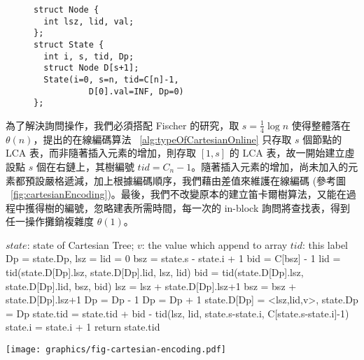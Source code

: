 \documentclass{gapd}
\begin{document}
\begin{figure}
\begin{lstlisting}
struct Node {
  int lsz, lid, val;
};
struct State {
  int i, s, tid, Dp;
  struct Node D[s+1];
  State(i=0, s=n, tid=C[n]-1, 
           D[0].val=INF, Dp=0)
};
\end{lstlisting}
\end{figure}

為了解決詢問操作，我們必須搭配 Fischer \cite{fischer} 的研究，取 $s = \frac{1}{4} \log n$ 使得整體落在 $\theta(n)$，提出的在線編碼算法 ~\ref{alg:typeOfCartesianOnline} 只存取 $s$ 個節點的 LCA 表，而非隨著插入元素的增加，則存取 $[1, s]$ 的 LCA 表，故一開始建立虛設點 $s$ 個在右鏈上，其樹編號 $\mathit{tid} = C_n - 1$。隨著插入元素的增加，尚未加入的元素都預設嚴格遞減，加上根據編碼順序，我們藉由差值來維護在線編碼 (參考圖 ~\ref{fig:cartesianEncoding})。最後，我們不改變原本的建立笛卡爾樹算法，又能在過程中擭得樹的編號，忽略建表所需時間，每一次的 in-block 詢問將查找表，得到任一操作攤銷複雜度 $\theta(1)$。

\begin{algorithm*}
  \caption{Online Type of Cartesian Tree}
  \label{alg:typeOfCartesianOnline}
  \begin{algorithmic}[1]
  \Require
      $\mathit{state}$: state of Cartesian Tree;
      $v$: the value which append to array
  \Ensure
      $\mathit{tid}$: this label
  \State Dp = state.Dp, lsz = lid = 0
  \State bsz = state.s - state.i + 1
  \State bid = C[bsz] - 1 
    \State lid = tid(state.D[Dp].lsz, state.D[Dp].lid, lsz, lid)
    \State bid = tid(state.D[Dp].lsz, state.D[Dp].lid, bsz, bid)
    \State lsz = lsz + state.D[Dp].lsz+1
    \State bsz = bsz + state.D[Dp].lsz+1
    \State Dp = Dp - 1
  \EndWhile
  \State Dp = Dp + 1
  \State state.D[Dp] = <lsz,lid,v>, state.Dp = Dp
  \State state.tid = state.tid + bid - tid(lsz, lid, state.s-state.i, C[state.s-state.i]-1)
  \State state.i = state.i + 1
  \State return state.tid
  \end{algorithmic}
\end{algorithm*}

\begin{figure*}
  \centering
  \texttt{[image: graphics/fig-cartesian-encoding.pdf]}
  \caption{每個區塊有 $s$ 個元素，初始情況虛設 $s$ 個點在右鏈，則具有 $s$ 個節點的 BST，其編號 $\text{tid}_0 = C_s - 1$。當插入第 $i$ 個元素時，當前編號為 $\text{tid}_i$，以節點 $A$ 為根的樹編號為 $A.\text{tid}$，若第 $i+1$ 個元素值為 $x$，其將會翻轉到 $A$ 之上，而 $A$ 成為 $x$ 的左子節點，翻轉過程中計算得到 $A.\text{tid}$，而以 $x$ 為根的樹將虛設 $s-(i+1)$ 個節點在其右鏈，最後得到 $x.\text{tid}$。根據字典順序，我們將得到 $\text{tid}_{i+1} = \text{tid}_{i} + (x.\text{tid} - A.\text{tid})$。}
  \label{fig:cartesianEncoding}
\end{figure*}
\end{document}
